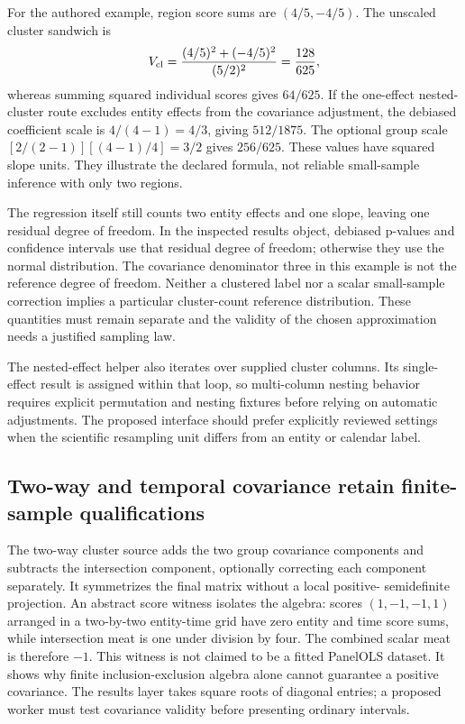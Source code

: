 For the authored example, region score sums are $(4/5,-4/5)$. The unscaled
cluster sandwich is
\[
 V_{\rm cl}=\frac{(4/5)^2+(-4/5)^2}{(5/2)^2}
             =\frac{128}{625},
\]
whereas summing squared individual scores gives $64/625$. If the one-effect
nested-cluster route excludes entity effects from the covariance adjustment,
the debiased coefficient scale is $4/(4-1)=4/3$, giving $512/1875$.
The optional group scale $[2/(2-1)][(4-1)/4]=3/2$ gives $256/625$.
These values have squared slope units. They illustrate the declared
formula, not reliable small-sample inference with only two regions.
\citep{exec24_lmpanel_reference}

The regression itself still counts two entity effects and one slope, leaving
one residual degree of freedom. In the inspected results object, debiased
p-values and confidence intervals use that residual degree of freedom;
otherwise they use the normal distribution. The covariance denominator
three in this example is not the reference degree of freedom. Neither a
clustered label nor a scalar small-sample correction implies a particular
cluster-count reference distribution. These quantities must remain separate
and the validity of the chosen approximation needs a justified sampling law.
\citep{exec24_lmpanel_source,exec24_lmpanel_reference}

The nested-effect helper also iterates over supplied cluster columns.
Its single-effect result is assigned within that loop, so multi-column
nesting behavior requires explicit permutation and nesting fixtures before
relying on automatic adjustments. The proposed interface should prefer
explicitly reviewed settings when the scientific resampling unit differs
from an entity or calendar label.\citep{exec24_lmpanel_source,exec24_lmpanel_reference}

\subsection{Two-way and temporal covariance retain finite-sample qualifications}
The two-way cluster source adds the two group covariance components and
subtracts the intersection component, optionally correcting each component
separately. It symmetrizes the final matrix without a local positive-
semidefinite projection. An abstract score witness isolates the algebra:
scores $(1,-1,-1,1)$ arranged in a two-by-two entity-time grid have zero
entity and time score sums, while intersection meat is one under division
by four. The combined scalar meat is therefore $-1$. This witness is not
claimed to be a fitted PanelOLS dataset. It shows why finite
inclusion-exclusion algebra alone cannot guarantee a positive covariance.
The results layer takes square roots of diagonal entries; a proposed worker
must test covariance validity before presenting ordinary intervals.
\citep{exec24_lmpanel_source,exec24_lmpanel_reference}


